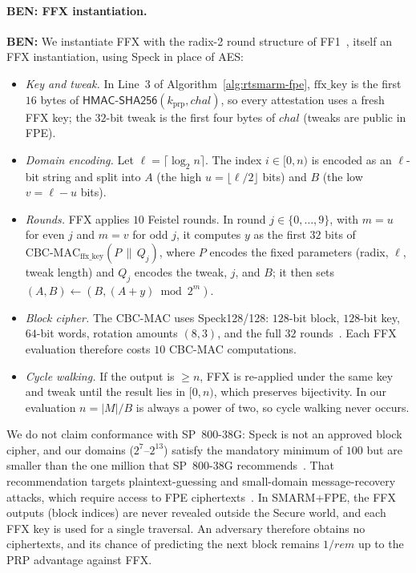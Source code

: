 \documentclass{ieeeaccess}
\DeclareRobustCommand{\ben}[1]{{\color{BENcolor}\textbf{BEN:} #1}}
\newcommand{\rtsmarmtwo}{SMARM+FPE\xspace}
\begin{document}
\paragraph{\ben{FFX instantiation.}}
\ben{We instantiate FFX with the radix-2 round structure of FF1~\cite{ff1}, itself an FFX instantiation, using Speck in place of AES:
\begin{itemize}
  \item \emph{Key and tweak.} In Line~3 of Algorithm~\ref{alg:rtsmarm-fpe}, $\text{ffx\_key}$ is the first $16$ bytes of $\mathsf{HMAC\text{-}SHA256}(k_{\mathrm{prp}}, chal)$, so every attestation uses a fresh FFX key; the $32$-bit tweak is the first four bytes of $chal$ (tweaks are public in FPE).
  \item \emph{Domain encoding.} Let $\ell = \lceil \log_2 n \rceil$. The index $i \in [0, n)$ is encoded as an $\ell$-bit string and split into $A$ (the high $u = \lfloor \ell/2 \rfloor$ bits) and $B$ (the low $v = \ell - u$ bits).
  \item \emph{Rounds.} FFX applies $10$ Feistel rounds. In round $j \in \{0,\dots,9\}$, with $m = u$ for even $j$ and $m = v$ for odd $j$, it computes $y$ as the first $32$ bits of $\mathrm{CBC\text{-}MAC}_{\text{ffx\_key}}(P \,\|\, Q_j)$, where $P$ encodes the fixed parameters (radix, $\ell$, tweak length) and $Q_j$ encodes the tweak, $j$, and $B$; it then sets $(A, B) \gets (B, (A + y) \bmod 2^m)$.
  \item \emph{Block cipher.} The CBC-MAC uses Speck128/128: $128$-bit block, $128$-bit key, $64$-bit words, rotation amounts $(8, 3)$, and the full $32$ rounds~\cite{speck}. Each FFX evaluation therefore costs $10$ CBC-MAC computations.
  \item \emph{Cycle walking.} If the output is $\ge n$, FFX is re-applied under the same key and tweak until the result lies in $[0, n)$, which preserves bijectivity. In our evaluation $n = |M|/B$ is always a power of two, so cycle walking never occurs.
\end{itemize}
We do not claim conformance with SP~800-38G: Speck is not an approved block cipher, and our domains ($2^{7}$--$2^{13}$) satisfy the mandatory minimum of $100$ but are smaller than the one million that SP~800-38G recommends~\cite{ff1}.
That recommendation targets plaintext-guessing and small-domain message-recovery attacks, which require access to FPE ciphertexts~\cite{hoang2018curse}.
In \rtsmarmtwo, the FFX outputs (block indices) are never revealed outside the Secure world, and each FFX key is used for a single traversal. An adversary therefore obtains no ciphertexts, and its chance of predicting the next block remains $1/rem$ up to the PRP advantage against FFX.}
\end{document}
